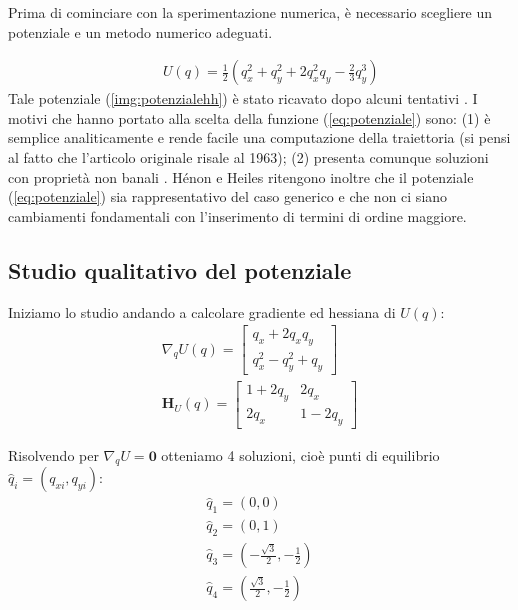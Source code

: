 \documentclass[a4paper, 12pt]{article}
\numberwithin{equation}{section}
\numberwithin{figure}{section}
\newcommand{\hess}[1]{\mathbf{H}_{#1}}
\begin{document}
Prima di cominciare con la sperimentazione numerica, è necessario scegliere un potenziale e un
metodo numerico adeguati.

\begin{eqnarray}	
	&&U(q) = \frac{1}{2}(q_x^2+q_y^2+2q_x^2q_y-\frac{2}{3}q_y^3) \label{eq:potenziale}
\end{eqnarray}
Tale potenziale (\ref{img:potenzialehh}) è stato ricavato dopo alcuni tentativi
\cite{1964henonheiles}.
I motivi che hanno portato alla scelta della funzione (\ref{eq:potenziale}) sono: (1)
è semplice analiticamente e rende facile una computazione della traiettoria (si pensi al fatto
che l'articolo originale risale al 1963);
(2) presenta comunque soluzioni con proprietà non banali \cite{hairer}. 
Hénon e Heiles ritengono inoltre che il potenziale (\ref{eq:potenziale}) sia rappresentativo del caso
generico e che non ci siano cambiamenti fondamentali con l'inserimento di termini di ordine maggiore.

\subsection{Studio qualitativo del potenziale}

Iniziamo lo studio andando a calcolare gradiente ed hessiana di $U(q)$:
\begin{eqnarray}
	\nabla_q U(q)= 
	\begin{bmatrix}
		q_x + 2q_xq_y\\
		q_x^2 - q_y^2 + q_y
	\end{bmatrix}\\[0.2cm]
% 
	\hess{U}(q)=
	\begin{bmatrix}
		1 + 2q_y & 2q_x\\
		2q_x & 1 - 2q_y
	\end{bmatrix}
\end{eqnarray}

Risolvendo per $\nabla_q U = \mathbf{0}$ otteniamo 4 soluzioni, cioè punti di equilibrio
$\hat{q}_i = (q_{xi}, q_{yi})$:
\begin{eqnarray*}
	\hat{q}_1 = (0,0)\\
	\hat{q}_2 = (0,1)\\
	\hat{q}_3 = (-\frac{\sqrt{3}}{2}, -\frac{1}{2})\\
	\hat{q}_4 = (\frac{\sqrt{3}}{2}, -\frac{1}{2})
\end{eqnarray*}
\end{document}
